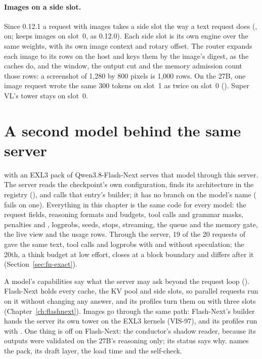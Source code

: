 \paragraph{Images on a side slot.} Since 0.12.1 a request with images takes a side slot the way a text request does (, on;  keeps images on slot~0, as 0.12.0). Each side slot is its own engine over the same weights, with its own image context and rotary offset. The router expands each image to its rows on the host and keys them by the image's digest, as the caches do, and the window, the output cut and the memory admission count those rows: a screenshot of 1,280 by 800 pixels is 1,000 rows. On the 27B, one image request wrote the same 300 tokens on slot~1 as twice on slot~0 (\measured). Super VL's tower stays on slot~0.

\section{A second model behind the same server}\label{sec:serving-flashnext}

 with an EXL3 pack of Qwen3.8-Flash-Next serves that model through this server. The server reads the checkpoint's own configuration, finds its architecture in the registry (), and calls that entry's builder; it has no branch on the model's name ( fails on one). Everything in this chapter is the same code for every model: the request fields, reasoning formats and budgets, tool calls and grammar masks, penalties and , logprobs, seeds, stops, streaming, the queue and the memory gate, the live view and the usage rows. Through the server, 19 of the 20 requests of  gave the same text, tool calls and logprobs with and without speculation; the 20th, a think budget at low effort, closes at a block boundary and differs after it (Section~\ref{sec:fn-exact}).

A model's capabilities say what the server may ask beyond the request loop (). Flash-Next holds every cache, the KV pool and side slots, so parallel requests run on it without changing any answer, and its profiles turn them on with three slots (Chapter~\ref{ch:flashnext}). Images go through the same path: Flash-Next's builder hands the server its own tower on the EXL3 kernels (VIS-97), and its profiles run with . One thing is off on Flash-Next: the conductor's shadow reader, because its outputs were validated on the 27B's reasoning only; its status says why.  names the pack, its draft layer, the load time and the self-check.

